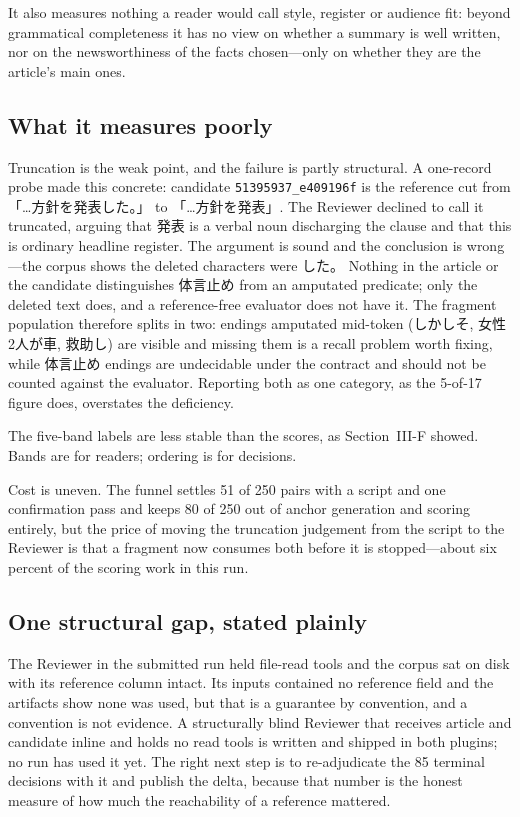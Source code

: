 \documentclass[conference]{IEEEtran}
\begin{document}
It also measures nothing a reader would call style, register or audience
fit: beyond grammatical completeness it has no view on whether a summary
is well written, nor on the newsworthiness of the facts chosen---only on
whether they are the article's main ones.

\subsection{What it measures poorly}
Truncation is the weak point, and the failure is partly structural. A
one-record probe made this concrete: candidate
\texttt{51395937\_e409196f} is the reference cut from 「…\mbox{方針を\mbox{発表}}した。」
to 「…\mbox{方針を\mbox{発表}}」. The Reviewer declined to call it truncated, arguing
that \mbox{発表} is a verbal noun discharging the clause and that this is
ordinary headline register. The argument is sound and the conclusion is
wrong---the corpus shows the deleted characters were した。 Nothing in
the article or the candidate distinguishes \mbox{体言止め} from an amputated
predicate; only the deleted text does, and a reference-free evaluator
does not have it. The fragment population therefore splits in two:
endings amputated mid-token (\mbox{しかしそ}, \mbox{女性2人が車}, \mbox{救助し}) are visible
and missing them is a recall problem worth fixing, while \mbox{体言止め} endings
are undecidable under the contract and should not be counted against the
evaluator. Reporting both as one category, as the 5-of-17 figure does,
overstates the deficiency.

The five-band labels are less stable than the scores, as
Section~III-F showed. Bands are for readers; ordering is for decisions.

Cost is uneven. The funnel settles 51 of 250 pairs with a script and one
confirmation pass and keeps 80 of 250 out of anchor generation and
scoring entirely, but the price of moving the truncation judgement from
the script to the Reviewer is that a fragment now consumes both before
it is stopped---about six percent of the scoring work in this run.

\subsection{One structural gap, stated plainly}
The Reviewer in the submitted run held file-read tools and the corpus
sat on disk with its reference column intact. Its inputs contained no
reference field and the artifacts show none was used, but that is a
guarantee by convention, and a convention is not evidence. A
structurally blind Reviewer that receives article and candidate inline
and holds no read tools is written and shipped in both plugins; no run
has used it yet. The right next step is to re-adjudicate the 85 terminal
decisions with it and publish the delta, because that number is the
honest measure of how much the reachability of a reference mattered.
\end{document}
